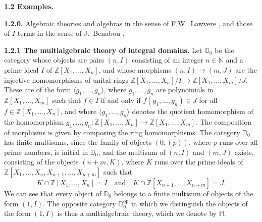 \documentclass{article}
\newenvironment{rmenv}[1]
  {\phantomsection\par\medskip\noindent\textbf{#1.}\rmfamily}
  {\medskip}
\newcommand{\bb}[1]{{\mathbb{#1}}}
\newcommand{\op}{{\mathrm{op}}}
\begin{document}
\begin{rmenv}{1.2 Examples}
\label{1.2}

  \begin{rmenv}{1.2.0}
  \label{1.2.0}
    Algebraic theories and algebras in the sense of F.W.~Lawvere \cite{6}, and those of $I$-terms in the sense of J.~Benabou \cite{1}.
  \end{rmenv}

  \begin{rmenv}{1.2.1 The multialgebraic theory of integral domains}
  \label{1.2.1}
    Let $\bb{D}_0$ be the category whose objects are pairs $(n,I)$ consisting of an integer $n\in\bb{N}$ and a prime ideal $I$ of $\bb{Z}[X_1,\ldots,X_n]$, and whose morphisms $(n,I)\to(m,J)$ are the injective homomorphisms of unital rings $\bb{Z}[X_1,\ldots,X_n]/I\to\bb{Z}[X_1,\ldots,X_m]/J$.
    These are of the form $\langle g_1,\ldots,g_n\rangle$, where $g_1,\ldots,g_n$ are polynomials in $\bb{Z}[X_1,\ldots,X_m]$ such that $f\in I$ if and only if $f(g_1,\ldots,g_n)\in J$ for all $f\in\bb{Z}[X_1,\ldots,X_n]$, and where $\langle g_1,\ldots,g_n\rangle$ denotes the quotient homomorphism of the homomorphism $g_1,\ldots,g_n\colon\bb{Z}[X_1,\ldots,X_n]\to\bb{Z}[X_1,\ldots,X_m]$.
    The composition of morphisms is given by composing the ring homomorphisms.
    The category $\bb{D}_0$ has finite multisums, since the family of objects $(0,(p))$, where $p$ runs over all prime numbers, is initial in $\bb{D}_0$, and the multisum of $(n,I)$ and $(m,J)$ exists, consisting of the objects $(n+m,K)$, where $K$ runs over the prime ideals of $\bb{Z}[X_1,\ldots,X_n,X_{n+1},\ldots,X_{n+m}]$ such that
    \[
      K\cap\bb{Z}[X_1,\ldots,X_n] = I
      \quad\text{and}\quad
      K\cap\bb{Z}[X_{n+1},\ldots,X_{n+m}] = J.
    \]
    We can see that every object of $\bb{D}_0$ belongs to a finite multisum of objects of the form $(1,I)$.
    The opposite category $\bb{D}_0^\op$ in which we distinguish the objects of the form $(1,I)$ is thus a multialgebraic theory, which we denote by $\bb{M}$.


\end{rmenv}
\end{rmenv}
\end{document}
